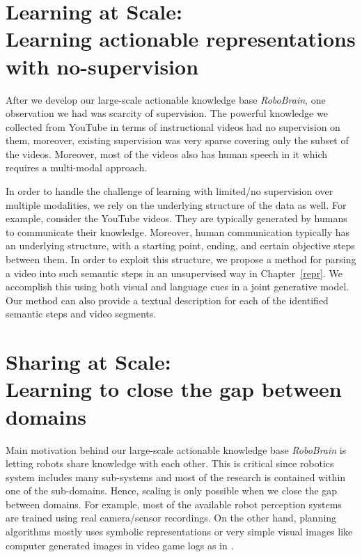 \section{Learning at Scale: \\ Learning actionable representations with no-supervision}
After we develop our large-scale actionable knowledge base \emph{RoboBrain}, one observation we had was scarcity of supervision. The powerful knowledge we collected from YouTube in terms of instructional videos had no supervision on them, moreover, existing supervision was very sparse covering only the subset of the videos. Moreover, most of the videos also has human speech in it which requires a multi-modal approach.

In order to handle the challenge of learning with limited/no supervision over multiple modalities, we rely on the underlying structure of the data as well. For example, consider the YouTube videos. They are typically generated by humans to communicate their knowledge. Moreover, human communication typically has an underlying structure, with a starting point, ending, and certain objective steps between them. In order to exploit this structure, we propose a method for parsing a video into such semantic steps in an unsupervised way in Chapter~\ref{repr}. We accomplish this using both visual and language cues in a joint generative model. Our method can also provide a textual description for each of the identified semantic steps and video segments. 

\section{Sharing at Scale: \\ Learning to close the gap between domains}
Main motivation behind our large-scale actionable knowledge base \emph{RoboBrain} is letting robots share knowledge with each other. This is critical since robotics system includes many sub-systems and most of the research is contained within one of the sub-domains. Hence, scaling is only possible when we close the gap between domains. For example, most of the available robot perception systems are trained using real camera/sensor recordings. On the other hand, planning algorithms mostly uses symbolic representations or very simple visual images like computer generated images in video game logs as in \cite{tellmedave}.

